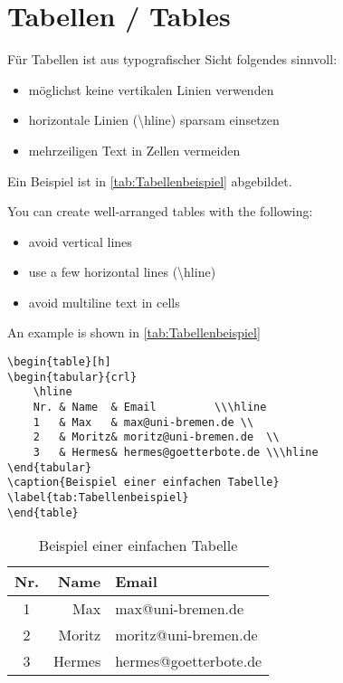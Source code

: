 \documentclass[]{iat}
\begin{document}
\section{Tabellen / Tables}
Für Tabellen ist aus typografischer Sicht folgendes sinnvoll:
\begin{itemize}
	\item möglichst keine vertikalen Linien verwenden
	\item horizontale Linien (\textbackslash hline) sparsam einsetzen
	\item mehrzeiligen Text in Zellen vermeiden
\end{itemize}
Ein Beispiel ist in \autoref{tab:Tabellenbeispiel} abgebildet.
\par
You can create well-arranged tables with the following:
\begin{itemize}
	\item avoid vertical lines
	\item use a few horizontal lines (\textbackslash hline)
	\item avoid multiline text in cells
\end{itemize}
An example is shown in \autoref{tab:Tabellenbeispiel}
\par
\begin{lstlisting}
\begin{table}[h]
\begin{tabular}{crl}
	\hline
	Nr.	& Name	& Email			\\\hline
	1	& Max	& max@uni-bremen.de	\\
	2	& Moritz& moritz@uni-bremen.de	\\
	3	& Hermes& hermes@goetterbote.de	\\\hline
\end{tabular}
\caption{Beispiel einer einfachen Tabelle}
\label{tab:Tabellenbeispiel}
\end{table}
\end{lstlisting}
\begin{table}[h]
	\begin{tabular}{crl}
		\hline
		Nr.	& Name	& Email			\\\hline
		1	& Max	& max@uni-bremen.de	\\
		2	& Moritz& moritz@uni-bremen.de	\\
		3	& Hermes& hermes@goetterbote.de	\\\hline
	\end{tabular}
	\caption{Beispiel einer einfachen Tabelle}
	\label{tab:Tabellenbeispiel}
\end{table}
\end{document}
